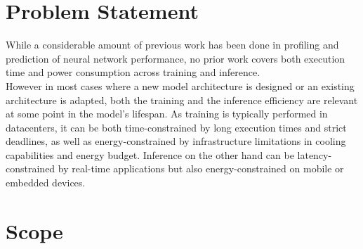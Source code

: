 \section{Problem Statement}
While a considerable amount of previous work has been done in
profiling and prediction of neural network performance, no prior work covers both execution time and power consumption across training and inference.\\
However in most cases where a new model architecture is designed or an existing architecture is adapted, both the training and the inference efficiency are relevant at some point in the model's lifespan. As training is typically performed in datacenters, it can be both time-constrained by long execution times and strict deadlines, as well as energy-constrained by infrastructure limitations in cooling capabilities and energy budget. Inference on the other hand can be latency-constrained by real-time applications but also energy-constrained on mobile or embedded devices. 



\section{Scope}


